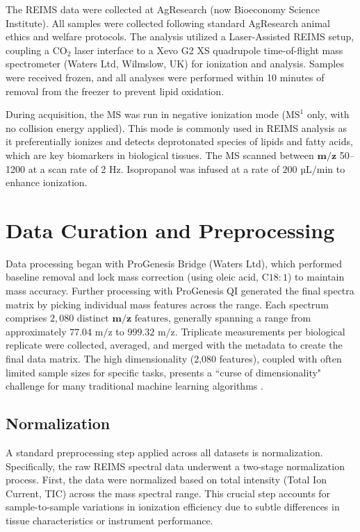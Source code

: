The REIMS data were collected at AgResearch (now Bioeconomy Science Institute). All samples were collected following standard AgResearch animal ethics and welfare protocols. The analysis utilized a Laser-Assisted REIMS setup, coupling a $\text{CO}_2$ laser interface to a Xevo G2 XS quadrupole time-of-flight mass spectrometer (Waters Ltd, Wilmslow, UK) for ionization and analysis. Samples were received frozen, and all analyses were performed within 10 minutes of removal from the freezer to prevent lipid oxidation.

During acquisition, the MS was run in negative ionization mode ($\text{MS}^1$ only, with no collision energy applied). This mode is commonly used in REIMS analysis as it preferentially ionizes and detects deprotonated species of lipids and fatty acids, which are key biomarkers in biological tissues. The MS scanned between $\mathbf{m/z}$ 50--1200 at a scan rate of 2 Hz. Isopropanol was infused at a rate of $200 \text{ µL/min}$ to enhance ionization.

\section{Data Curation and Preprocessing}
\label{sec:data_curation_preprocessing}

Data processing began with ProGenesis Bridge (Waters Ltd), which performed baseline removal and lock mass correction (using oleic acid, $\text{C}18:1$) to maintain mass accuracy. Further processing with ProGenesis QI generated the final spectra matrix by picking individual mass features across the range. Each spectrum comprises $2,080 \text{ distinct } \mathbf{m/z} \text{ features}$, generally spanning a range from approximately $\text{77.04 m/z}$ to $\text{999.32 m/z}$. Triplicate measurements per biological replicate were collected, averaged, and merged with the metadata to create the final data matrix. The high dimensionality (2,080 features), coupled with often limited sample sizes for specific tasks, presents a ``curse of dimensionality" challenge for many traditional machine learning algorithms \citep{Koppen2000}.

\subsection{Normalization}

A standard preprocessing step applied across all datasets is normalization. Specifically, the raw REIMS spectral data underwent a two-stage normalization process. First, the data were normalized based on total intensity (Total Ion Current, TIC) across the mass spectral range. This crucial step accounts for sample-to-sample variations in ionization efficiency due to subtle differences in tissue characteristics or instrument performance.

